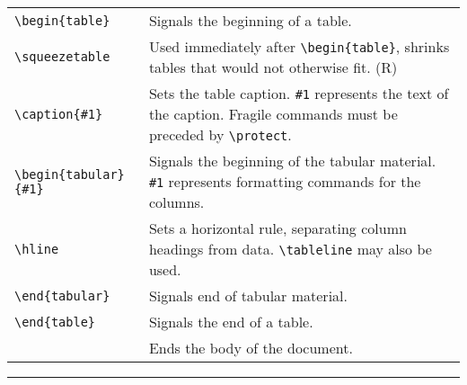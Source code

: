 \begin{quasitable}
\begin{tabular}{lp{4.5in}}
\verb+\begin{table}+  &
           Signals the beginning of a table.
                          \\[4pt]

\verb+\squeezetable+  &
           Used immediately after \verb+\begin{table}+, shrinks tables
                        that would not otherwise fit. (R)
                          \\[4pt]

\verb+\caption{#1}+  &
            Sets the table caption. \verb+#1+ represents the
                        text of the caption.
      Fragile commands must be preceded by \verb+\protect+.
        \\[4pt]

\verb+\begin{tabular}{#1}+  &
     Signals the beginning of the tabular material.  \verb+#1+
                        represents formatting commands for the columns.
                          \\[4pt]

\verb+\hline+  &
                  Sets a horizontal rule, separating column headings
                        from data. \verb+\tableline+ may also be used.
                          \\[4pt]

\verb+\end{tabular}+  &
           Signals end of tabular material.
                          \\[4pt]

\verb+\end{table}+  &
             Signals the end of a table.
                          \\[4pt]

\verb++  &
          Ends the body of the \REVTeX{} document.
                          \\[4pt]
\end{tabular}
\end{quasitable}


\smallskip\hrule


